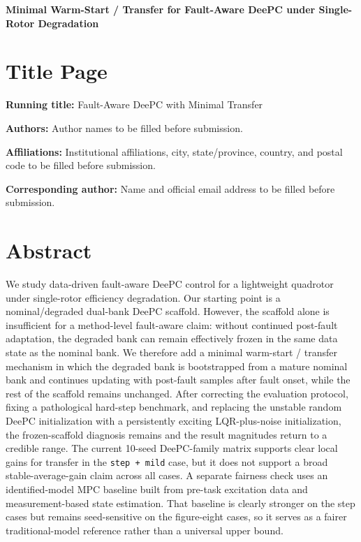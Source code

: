 \documentclass[12pt,a4paper]{article}
\begin{document}
\onehalfspacing

\begin{center}
    \textbf{\LARGE Minimal Warm-Start / Transfer for Fault-Aware DeePC under Single-Rotor Degradation}
\end{center}

\vspace{1em}

\section*{Title Page}

\noindent\textbf{Running title:} Fault-Aware DeePC with Minimal Transfer

\vspace{0.5em}
\noindent\textbf{Authors:} Author names to be filled before submission.

\vspace{0.5em}
\noindent\textbf{Affiliations:} Institutional affiliations, city, state/province, country, and postal code to be filled before submission.

\vspace{0.5em}
\noindent\textbf{Corresponding author:} Name and official email address to be filled before submission.

\vspace{1em}

\section*{Abstract}
We study data-driven fault-aware DeePC control for a lightweight quadrotor under single-rotor efficiency degradation. Our starting point is a nominal/degraded dual-bank DeePC scaffold. However, the scaffold alone is insufficient for a method-level fault-aware claim: without continued post-fault adaptation, the degraded bank can remain effectively frozen in the same data state as the nominal bank. We therefore add a minimal warm-start / transfer mechanism in which the degraded bank is bootstrapped from a mature nominal bank and continues updating with post-fault samples after fault onset, while the rest of the scaffold remains unchanged. After correcting the evaluation protocol, fixing a pathological hard-step benchmark, and replacing the unstable random DeePC initialization with a persistently exciting LQR-plus-noise initialization, the frozen-scaffold diagnosis remains and the result magnitudes return to a credible range. The current 10-seed DeePC-family matrix supports clear local gains for transfer in the \texttt{step + mild} case, but it does not support a broad stable-average-gain claim across all cases. A separate fairness check uses an identified-model MPC baseline built from pre-task excitation data and measurement-based state estimation. That baseline is clearly stronger on the step cases but remains seed-sensitive on the figure-eight cases, so it serves as a fairer traditional-model reference rather than a universal upper bound.
\end{document}
